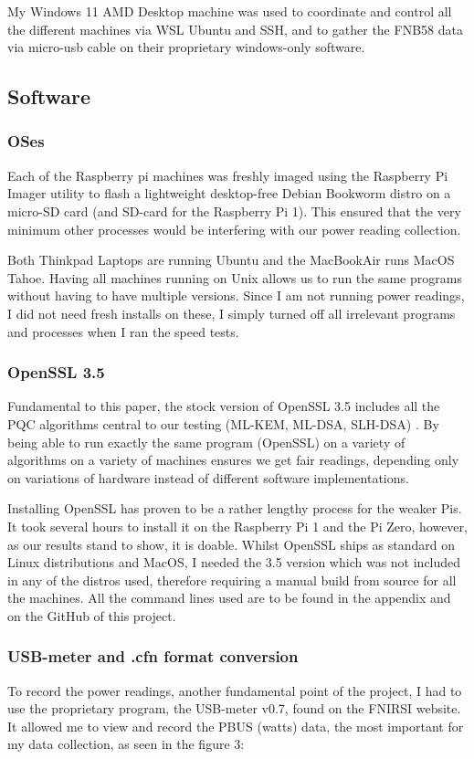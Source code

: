 \documentclass[11pt, letterpaper]{article}
\begin{document}
My Windows 11 AMD Desktop machine was used to coordinate and control all the different machines via WSL Ubuntu and SSH, and to gather the FNB58 data via micro-usb cable on their proprietary windows-only software.

\subsection{Software}
\subsubsection{OSes}
Each of the Raspberry pi machines was freshly imaged using the Raspberry Pi Imager utility to flash a lightweight desktop-free Debian Bookworm distro on a micro-SD card (and SD-card for the Raspberry Pi 1). This ensured that the very minimum other processes would be interfering with our power reading collection.

Both Thinkpad Laptops are running Ubuntu and the MacBookAir runs MacOS Tahoe. Having all machines running on Unix allows us to run the same programs without having to have multiple versions. Since I am not running power readings, I did not need fresh installs on these, I simply turned off all irrelevant programs and processes when I ran the speed tests.

\subsubsection{OpenSSL 3.5}
Fundamental to this paper, the stock version of OpenSSL 3.5 includes all the PQC algorithms central to our testing (ML-KEM, ML-DSA, SLH-DSA) \cite{openssl2025pqc}. By being able to run exactly the same program (OpenSSL) on a variety of algorithms on a variety of machines ensures we get fair readings, depending only on variations of hardware instead of different software implementations.

Installing OpenSSL has proven to be a rather lengthy process for the weaker Pis. It took several hours to install it on the Raspberry Pi 1 and the Pi Zero, however, as our results stand to show, it is doable. Whilst OpenSSL ships as standard on Linux distributions and MacOS, I needed the 3.5 version which was not included in any of the distros used, therefore requiring a manual build from source for all the machines. All the command lines used are to be found in the appendix and on the GitHub of this project.

\subsubsection{USB-meter and .cfn format conversion}
To record the power readings, another fundamental point of the project, I had to use the proprietary program, the USB-meter v0.7, found on the FNIRSI website. \cite{fnirsi2025software} It allowed me to view and record the PBUS (watts) data, the most important for my data collection, as seen in the figure 3:
\end{document}
